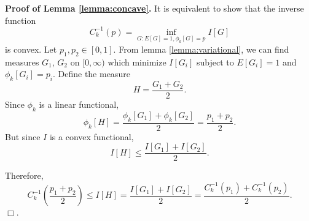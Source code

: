 \textbf{Proof of Lemma \ref{lemma:concave}.}
It is equivalent to show that the inverse function
\[
C^{-1}_k(p) = \inf_{G: E[G] = 1, \phi_k[G] = p} I[G]
\]
is convex.  Let $p_1, p_2 \in [0,1]$.  From
lemma \ref{lemma:variational}, we can find measures $G_1$, $G_2$ on
$[0,\infty)$ which minimize $I[G_i]$ subject to $E[G_i] = 1$ and
$\phi_k[G_i] = p_i$.  Define the measure
\[
H = \frac{G_1 + G_2}{2}.
\]
Since $\phi_k$ is a linear functional,
\[
\phi_k[H] = \frac{\phi_k[G_1] + \phi_k[G_2]}{2} = \frac{p_1 + p_2}{2}.
\]
But since $I$ is a convex functional,
\[
I[H] \leq \frac{I[G_1] + I[G_2]}{2}.
\]

Therefore,
\[
C^{-1}_k\left(\frac{p_1 + p_2}{2}\right) \leq I[H] = \frac{I[G_1] + I[G_2]}{2} = \frac{C^{-1}_k(p_1) + C^{-1}_k(p_2)}{2}.
\]
$\Box$.
